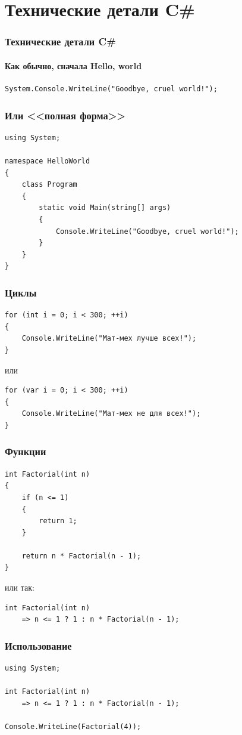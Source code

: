 \documentclass[xetex,mathserif,serif]{beamer}
\begin{document}
    \section{Технические детали C\#}

    \begin{frame}[fragile]
        \frametitle{Технические детали C\#}
        \framesubtitle{Как обычно, сначала Hello, world}
        \begin{verbatim}
System.Console.WriteLine("Goodbye, cruel world!");
        \end{verbatim}
    \end{frame}

    \begin{frame}[fragile]
        \frametitle{Или <<полная форма>>}
        \begin{verbatim}
using System;

namespace HelloWorld
{
    class Program
    {
        static void Main(string[] args)
        {
            Console.WriteLine("Goodbye, cruel world!");
        }
    }
}
        \end{verbatim}
    \end{frame}

    \begin{frame}[fragile]
        \frametitle{Циклы}
        \begin{verbatim}
for (int i = 0; i < 300; ++i)
{
    Console.WriteLine("Мат-мех лучше всех!");
}
        \end{verbatim}
        или
        \begin{verbatim}
for (var i = 0; i < 300; ++i)
{
    Console.WriteLine("Мат-мех не для всех!");
}
        \end{verbatim}
    \end{frame}

    \begin{frame}[fragile]
        \frametitle{Функции}
        \begin{verbatim}
int Factorial(int n)
{
    if (n <= 1)
    {
        return 1;
    }

    return n * Factorial(n - 1);
}
        \end{verbatim}
        или так:
        \begin{verbatim}
int Factorial(int n) 
    => n <= 1 ? 1 : n * Factorial(n - 1);
        \end{verbatim}
    \end{frame}

    \begin{frame}[fragile]
        \frametitle{Использование}
        \begin{verbatim}
using System;

int Factorial(int n) 
    => n <= 1 ? 1 : n * Factorial(n - 1);

Console.WriteLine(Factorial(4));

        \end{verbatim}
    \end{frame}
\end{document}
